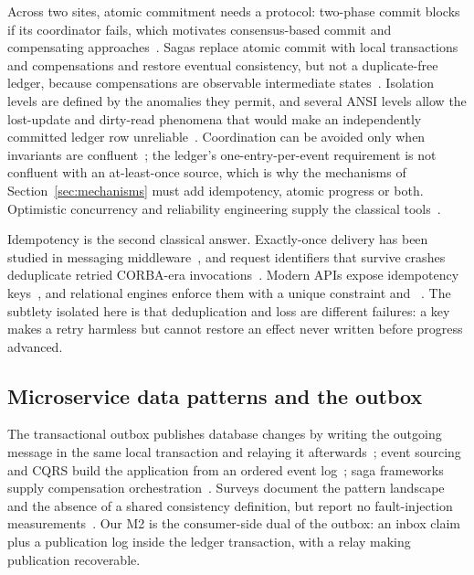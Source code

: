Across two sites, atomic commitment needs a protocol: two-phase commit blocks if its coordinator
fails, which motivates consensus-based commit and compensating approaches~\cite{txncommit2006,pg-prepare}.
Sagas replace atomic commit with local transactions and compensations and restore eventual
consistency, but not a duplicate-free ledger, because compensations are observable intermediate
states~\cite{sagas1987,saga2022}. Isolation levels are defined by the anomalies they permit, and
several ANSI levels allow the lost-update and dirty-read phenomena that would make an
independently committed ledger row unreliable~\cite{berenson1995,pg-isolation}. Coordination can
be avoided only when invariants are confluent~\cite{bailis2014}; the ledger's one-entry-per-event
requirement is not confluent with an at-least-once source, which is why the mechanisms of
Section~\ref{sec:mechanisms} must add idempotency, atomic progress or both. Optimistic
concurrency and reliability engineering supply the classical tools~\cite{kung1981,vogels2009}.

Idempotency is the second classical answer. Exactly-once delivery has been studied in
messaging middleware~\cite{eosmsg2001,eosmid2012}, and request identifiers that survive
crashes deduplicate retried CORBA-era invocations~\cite{eoscorba1999}. Modern APIs expose
idempotency keys~\cite{stripe-idempotency}, and relational engines enforce
them with a unique constraint and ~\cite{pg-onconflict}. The
subtlety isolated here is that deduplication and loss are different failures: a key makes
a retry harmless but cannot restore an effect never written before progress advanced.

\subsection{Microservice data patterns and the outbox}
\label{sec:rel-micro}

The transactional outbox publishes database changes by writing the outgoing message in the same
local transaction and relaying it afterwards~\cite{debezium-outbox}; event sourcing and CQRS
build the application from an ordered event log~\cite{eventsourcing2022}; saga frameworks supply
compensation orchestration~\cite{saga2019,saga2022}. Surveys document the pattern landscape and
the absence of a shared consistency definition, but report no fault-injection
measurements~\cite{laigner2021,micro2026}. Our M2 is the consumer-side dual of the outbox: an
inbox claim plus a publication log inside the ledger transaction, with a relay making publication
recoverable.

